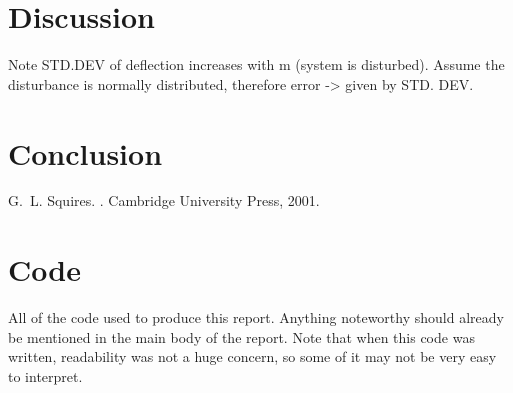 \documentclass[11pt,a4paper]{article}
\begin{document}
\newpage
\section{\label{sect:discussion}Discussion}

Note STD.DEV of deflection increases with m (system is disturbed). Assume the disturbance is normally distributed, therefore error -> given by STD. DEV.
 
\section{\label{sect:conclusion}Conclusion}




\begin{thebibliography}{1}

G.~L. Squires.
.
\newblock Cambridge University Press, 2001.

\end{thebibliography}

\appendix*
\section{Code}
All of the code used to produce this report. Anything noteworthy should already be mentioned in the main body of the report. Note that when this code was written, readability was not a huge concern, so some of it may not be very easy to interpret. 



\end{document}

